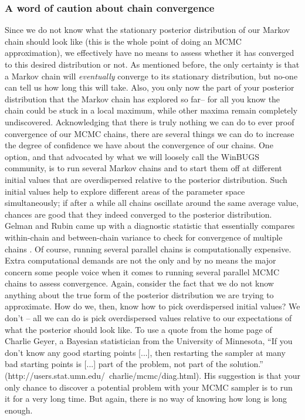 \subsubsection{A word of caution about chain convergence }
Since we do not know what the stationary posterior distribution of our Markov chain should look like (this is the whole point of doing an MCMC approximation), we effectively have no means to assess whether it has converged to this desired distribution or not. As mentioned before, the only certainty is that a Markov chain will {\it eventually} converge to its stationary distribution, but no-one can tell us how long this will take. Also, you only now the part of your posterior distribution that the Markov chain has explored so far– for all you know the chain could be stuck in a local maximum, while other maxima remain completely undiscovered.  Acknowledging that there is truly nothing we can do to ever proof convergence of our MCMC chains, there are several things we can do to increase the degree of confidence we have about the convergence of our chains. One option, and that advocated by what we will loosely call the WinBUGS community, is to run several Markov chains and to start them off at different initial values that are overdispersed relative to the posterior distribution. Such initial values help to explore different areas of the parameter space simultaneously; if after a while all chains oscillate around the same average value, chances are good that they indeed converged to the posterior distribution. Gelman and Rubin came up with a diagnostic statistic that essentially compares within-chain and between-chain variance to check for convergence of multiple chains \citep{gelman_etal:2004}. Of course, running several parallel chains is computationally expensive. 
Extra computational demands are not the only and by no means the major concern some people voice when it comes to running several parallel MCMC chains to assess convergence. Again, consider the fact that we do not know anything about the true form of the posterior distribution we are trying to approximate. How do we, then, know how to pick overdispersed initial values? We don’t – all we can do is pick overdispersed values relative to our expectations of what the posterior should look like. To use a quote from the home page of Charlie Geyer, a Bayesian statistician from the University of Minnesota, ``If you don't know any good starting points [...], then restarting the sampler at many bad starting points is [...] part of the problem, not part of the solution.'' (http://users.stat.umn.edu/~charlie/mcmc/diag.html). His suggestion is that your only chance to discover a potential problem with your MCMC sampler is to run it for a very long time. But again, there is no way of knowing how long is long enough. 
